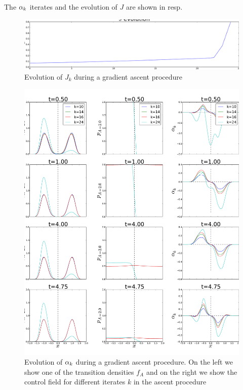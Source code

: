 \documentclass{article}
\begin{document}
The ${\alpha}_k$ iterates and the evolution of $J$ are shown in resp.

\begin{figure}[htp]
\begin{center}
  \includegraphics[width=\textwidth]{Figs/DoublewellFBSolver/FB_J_iterates_example.pdf}
  \caption[labelInTOC]{Evolution of $J_k$ during a gradient ascent procedure}
  \label{fig:J_iterates_double_well_example}
\end{center}
\end{figure}

\begin{figure}[htp]  
\begin{center}
  \includegraphics[width=\textwidth]{Figs/DoublewellFBSolver/FB_alpha_iterates_example.pdf}
  \caption[labelInTOC]{Evolution of ${\alpha}_k$ during a gradient ascent procedure.
  On the left we show one of the transition densities $f_{A}$ and on the right
  we show the control field for different iterates $k$ in the ascent
  procedure}
  \label{fig:alpha_iterates_double_well_example}
\end{center}
\end{figure}
\end{document}
